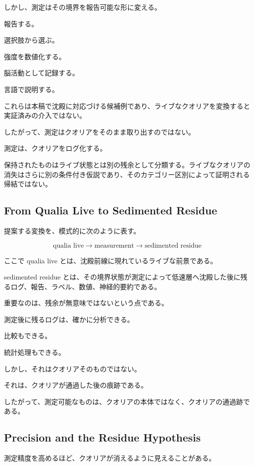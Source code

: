 しかし、測定はその境界を報告可能な形に変える。

報告する。

選択肢から選ぶ。

強度を数値化する。

脳活動として記録する。

言語で説明する。

これらは本稿で沈殿に対応づける候補例であり、ライブなクオリアを変換すると実証済みの介入ではない。

したがって、測定はクオリアをそのまま取り出すのではない。

測定は、クオリアをログ化する。

保持されたものはライブ状態とは別の残余として分類する。ライブなクオリアの消失はさらに別の条件付き仮説であり、そのカテゴリー区別によって証明される帰結ではない。

\subsection{From Qualia Live to Sedimented Residue}

提案する変換を、模式的に次のように表す。

\begin{equation}
\text{qualia live}
\rightarrow
\text{measurement}
\rightarrow
\text{sedimented residue}
\end{equation}

ここで qualia live とは、沈殿前線に現れているライブな前景である。

sedimented residue とは、その境界状態が測定によって低速層へ沈殿した後に残るログ、報告、ラベル、数値、神経的要約である。

重要なのは、残余が無意味ではないという点である。

測定後に残るログは、確かに分析できる。

比較もできる。

統計処理もできる。

しかし、それはクオリアそのものではない。

それは、クオリアが通過した後の痕跡である。

したがって、測定可能なものは、クオリアの本体ではなく、クオリアの通過跡である。

\subsection{Precision and the Residue Hypothesis}

測定精度を高めるほど、クオリアが消えるように見えることがある。

